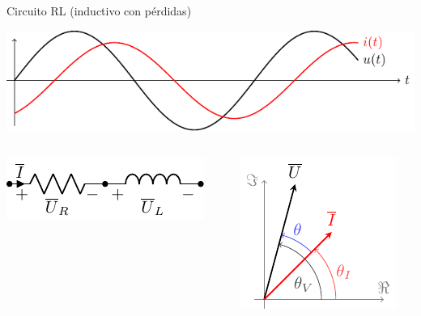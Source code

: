 \documentclass[xcolor={usenames,svgnames,dvipsnames}]{beamer}
\begin{document}
\begin{frame}[label={sec:org164074b}]{Circuito RL (inductivo con pérdidas)}
\begin{center}
\includegraphics[height=0.25\textheight]{figs/inductivo.pdf}
\end{center}
\begin{columns}
\begin{column}{0.45\columnwidth}
\begin{center}
\includegraphics[width=.9\linewidth]{figs/RL.pdf}
\end{center}
\end{column}


\begin{column}{0.55\columnwidth}
\begin{center}
\includegraphics[height=0.5\textheight]{figs/fasorInductanciaReal_VI.pdf}
\end{center}
\end{column}
\end{columns}
\end{frame}
\end{document}
